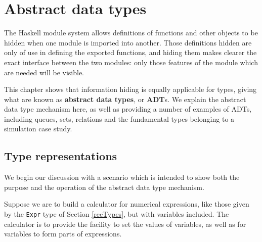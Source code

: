 
\chapter{Abstract data types}
\chapstart
\label{adt}

The Haskell module system allows definitions of functions and other objects to
be hidden when one module is imported into another. Those definitions
hidden are only of use in defining the exported functions, and hiding them
makes clearer the exact interface between the two modules: only those features
of the module which are needed will be visible.

This chapter shows that information hiding is equally applicable for types,
giving what are known as \textbf{abstract data types}, or \textbf{ADT}s. We explain the abstract data type
mechanism here, as well as
providing a number of examples of ADTs, including queues, sets, relations and the fundamental
types belonging to a simulation case study.

\begin{webvideos}
\end{webvideos}

\section{Type representations}

We begin our discussion with a scenario which is intended to show both the
purpose and the operation of the abstract data type mechanism.

Suppose we are to build a calculator for numerical expressions, like those
given by the \texttt{Expr} type of Section \ref{recTypes}, but with variables
included.
The calculator is to provide the facility to set the values of variables, as
well as for variables to form parts of expressions. 

